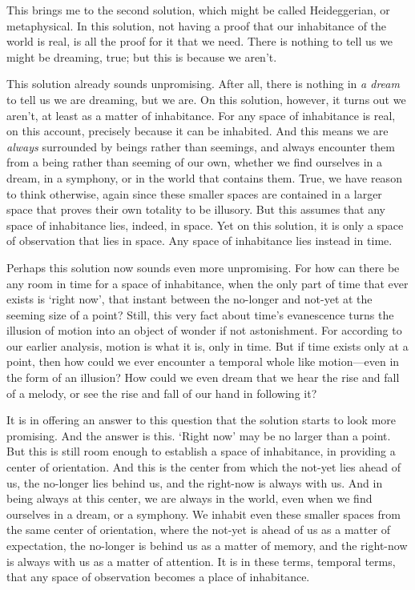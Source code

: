 \documentclass[12pt]{memoir}
\begin{document}
This brings me to the second solution, which might
be called Heideggerian, or metaphysical. In this
solution, not having a proof that our inhabitance
of the world is real, is all the proof for it that
we need. There is nothing to tell us we might be
dreaming, true; but this is because we aren't.

This solution already sounds unpromising. After
all, there is nothing in \emph{a dream} to
tell us we are dreaming, but we are. On this
solution, however, it turns out we aren't, at
least as a matter of inhabitance. For any space of
inhabitance is real, on this account, precisely
because it can be inhabited. And this means we are
\emph{always} surrounded by beings rather than
seemings, and always encounter them from a being
rather than seeming of our own, whether we find
ourselves in a dream, in a symphony, or in the
world that contains them. True, we have reason to
think otherwise, again since these smaller spaces
are contained in a larger space that proves their
own totality to be illusory. But this assumes
that any space of inhabitance lies, indeed, in
space. Yet on this solution, it is only a space
of observation that lies in space. Any space of
inhabitance lies instead in time.

Perhaps this solution now sounds even more
unpromising. For how can there be any room in time
for a space of inhabitance, when the only part of
time that ever exists is `right now', that instant
between the no-longer and not-yet at the seeming
size of a point? Still, this very fact about
time's evanescence turns the illusion of motion
into an object of wonder if not astonishment.
For according to our earlier analysis, motion is
what it is, only in time. But if time exists only
at a point, then how could we ever encounter a
temporal whole like motion---even in the form of
an illusion? How could we even dream that we hear
the rise and fall of a melody, or see the rise and
fall of our hand in following it?

It is in offering an answer to this question that
the solution starts to look more promising. And
the answer is this. `Right now' may be no larger
than a point. But this is still room enough to
establish a space of inhabitance, in providing a
center of orientation. And this is the center from
which the not-yet lies ahead of us, the no-longer
lies behind us, and the right-now is always
with us. And in being always at this center,
we are always in the world, even when we find
ourselves in a dream, or a symphony. We inhabit
even these smaller spaces from the same center of
orientation, where the not-yet is ahead of us as
a matter of expectation, the no-longer is behind
us as a matter of memory, and the right-now is
always with us as a matter of attention. It is in
these terms, temporal terms, that any space of
observation becomes a place of inhabitance.
\end{document}
